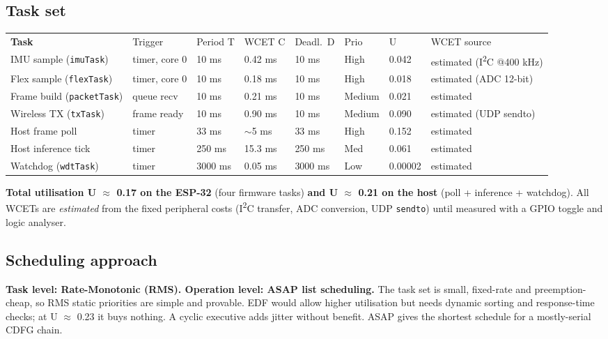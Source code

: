\documentclass[11pt,a4paper]{article}
\newcommand{\hdrow}[1]{\rowcolor{headbg}\color{headfg}\bfseries #1}
\begin{document}
\subsection{Task set}
\begin{tabularx}{\textwidth}{@{}p{3.0cm}p{1.9cm}p{1.3cm}p{1.3cm}p{1.3cm}p{1.2cm}p{1.3cm}X@{}}
\hdrow{Task & Trigger & Period T & WCET C & Deadl.\ D & Prio & U & WCET source} \\[1pt]
IMU sample (\texttt{imuTask}) & timer, core 0 & 10 ms & 0.42 ms & 10 ms & High & 0.042 & estimated (I\textsuperscript{2}C @400 kHz) \\
Flex sample (\texttt{flexTask}) & timer, core 0 & 10 ms & 0.18 ms & 10 ms & High & 0.018 & estimated (ADC 12-bit) \\
Frame build (\texttt{packetTask}) & queue recv & 10 ms & 0.21 ms & 10 ms & Medium & 0.021 & estimated \\
Wireless TX (\texttt{txTask}) & frame ready & 10 ms & 0.90 ms & 10 ms & Medium & 0.090 & estimated (UDP sendto) \\
Host frame poll & timer & 33 ms & $\sim$5 ms & 33 ms & High & 0.152 & estimated \\
Host inference tick & timer & 250 ms & 15.3 ms & 250 ms & Med & 0.061 & estimated \\
Watchdog (\texttt{wdtTask}) & timer & 3000 ms & 0.05 ms & 3000 ms & Low & 0.00002 & estimated \\
\end{tabularx}

\noindent\textbf{Total utilisation U $\approx$ 0.17 on the ESP-32} (four firmware
tasks) \textbf{and U $\approx$ 0.21 on the host} (poll + inference + watchdog).
All WCETs are \emph{estimated} from the fixed peripheral costs
(I\textsuperscript{2}C transfer, ADC conversion, UDP \texttt{sendto}) until
measured with a GPIO toggle and logic analyser.

\subsection{Scheduling approach}
\textbf{Task level: Rate-Monotonic (RMS). Operation level: ASAP list
scheduling.} The task set is small, fixed-rate and preemption-cheap, so RMS
static priorities are simple and provable. EDF would allow higher utilisation
but needs dynamic sorting and response-time checks; at U $\approx$ 0.23 it buys
nothing. A cyclic executive adds jitter without benefit. ASAP gives the shortest
schedule for a mostly-serial CDFG chain.
\end{document}
